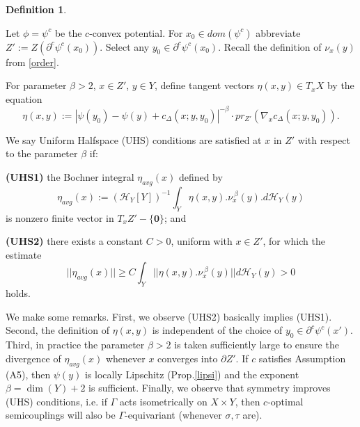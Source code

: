 \documentclass[12pt]{amsart}
\theoremstyle{definition}
\newtheorem{dfn}{Definition}
\theoremstyle{remark}
\newcommand{\del}{\partial}
\newcommand{\sub}{\del^c \psi^c(x')}
\newcommand{\cd}{c_\Delta}
\begin{document}
\begin{dfn}
\label{whs}

Let $\phi=\psi^c$ be the $c$-convex potential. For $x_0\in dom(\psi^c)$ abbreviate $Z':=Z(\del^c \psi^c(x_0))$. Select any $y_0\in \del^c \psi^c(x_0)$. Recall the definition of $\nu_x(y)$ from \ref{order}.

For parameter $\beta>2$, $x\in Z'$, $y\in Y$, define tangent vectors $\eta(x,y) \in T_x X$ by the equation \begin{equation}\eta(x, y):=|\psi(y_0)-\psi(y)+\cd(x; y, y_0)|^{-\beta} \cdot pr_{Z'}( \nabla_x \cd(x; y, y_0)). \label{lower0}
\end{equation} 

We say Uniform Halfspace (UHS) conditions are satisfied at $x$ in $Z'$ with respect to the parameter $\beta$ if: 

\textbf{(UHS1)} the Bochner integral $\eta_{avg}(x)$ defined by \begin{equation}\eta_{avg}(x):=(\mathscr{H}_Y[Y])^{-1} \int_{Y} \eta(x,y) . \nu^{~\beta}_x(y) . d\mathscr{H}_Y(y) \label{lowera}
\end{equation} is nonzero finite vector in $T_{x}Z'-\{\textbf{0}\}$; and 

\textbf{(UHS2)} there exists a constant $C>0$, uniform with $x\in Z'$, for which the estimate \begin{equation} 
||\eta_{avg}(x)|| \geq C \int_{Y} ||\eta(x,y) . \nu^{~\beta}_x(y)|| d\mathscr{H}_Y(y) >0 \label{lowerb}
\end{equation} holds.
\end{dfn}

We make some remarks. First, we observe (UHS2) basically implies (UHS1). Second, the definition of $\eta(x,y)$ is independent of the choice of $y_0 \in \sub$. Third, in practice the parameter $\beta>2$ is taken sufficiently large to ensure the divergence of $\eta_{avg}(x)$ whenever $x$ converges into $\del Z'$. If $c$ satisfies Assumption (A5), then $\psi(y)$ is locally Lipschitz (Prop.\ref{lipsi}) and the exponent $\beta=\dim(Y)+2$ is sufficient. Finally, we observe that symmetry improves (UHS) conditions, i.e. if $\Gamma$ acts isometrically on $X\times Y$, then $c$-optimal semicouplings will also be $\Gamma$-equivariant (whenever $\sigma, \tau$ are).




\end{document}
